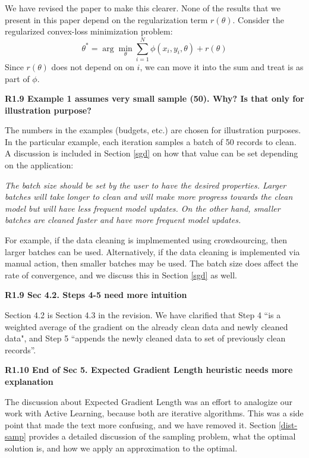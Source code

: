 \noindent We have revised the paper to make this clearer.
None of the results that we present in this paper depend on the regularization term $r(\theta)$.
Consider the regularized convex-loss minimization problem:
\[
 \theta^{*}=\arg\min_{\theta}\sum_{i=1}^{N}\phi(x_{i},y_{i},\theta) + r(\theta)
\]
Since $r(\theta)$ does not depend on on $i$, we can move it into the sum and treat is as part of $\phi$.

\vspace{0.5em}

\noindent\textbf{R1.9 Example 1 assumes very small sample (50). Why? Is that only for illustration purpose?}

\noindent   The numbers in the examples (budgets, etc.) are chosen for illustration purposes. In the particular example, each iteration samples a batch of 50 records to clean.  A discussion is included in Section \ref{sgd} on how that value can be set depending on the application:

\vspace{0.5em}
\emph{The batch size should be set by the user to have the desired properties.
Larger batches will take longer to clean and will make more progress towards the clean model but will have less frequent model updates.
On the other hand, smaller batches are cleaned faster and have more frequent model updates.}

\vspace{0.5em}

For example, if the data cleaning is implmemented using crowdsourcing, then larger batches can be used. Alternatively, if the data cleaning is implemented via manual action, then smaller batches may be used.
The batch size does affect the rate of convergence, and we discuss this in Section \ref{sgd} as well. 

\noindent\textbf{R1.9 Sec 4.2. Steps 4-5 need more intuition}

\noindent  Section 4.2 is Section 4.3 in the revision. We have clarified that Step 4 ``is a weighted average of the gradient on the already clean data and newly cleaned data", and Step 5 ``appends the newly cleaned data to set of previously clean records''.

\vspace{0.5em}

\noindent\textbf{R1.10 End of Sec 5. Expected Gradient Length heuristic needs more explanation}

\noindent  The discussion about Expected Gradient Length was an effort to analogize our work with Active Learning, because both are iterative algorithms. This was a side point that made the text more confusing, and we have removed it.
Section \ref{dist-samp} provides a detailed discussion of the sampling problem, what the optimal solution is, and how we apply an approximation to the optimal.

